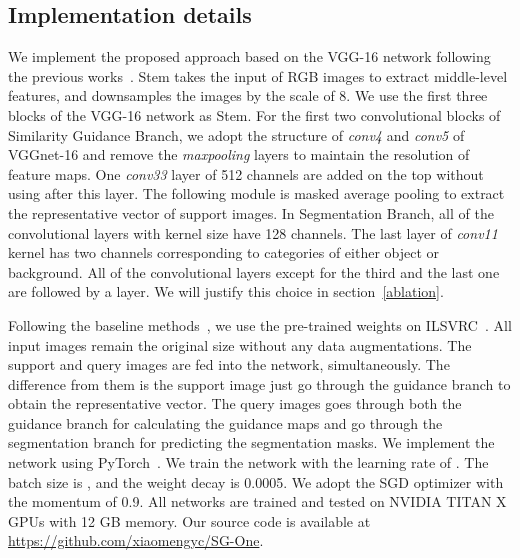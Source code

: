 \documentclass[journal]{IEEEtran}
\begin{document}
\subsection{Implementation details}
We implement the proposed approach based on the VGG-16 network following the previous works~\cite{shaban2017one,rakelly2018conditional}.
Stem takes the input of RGB images to extract middle-level features, and downsamples the images by the scale of 8.
We use the first three blocks of the VGG-16 network as Stem.
For the first two convolutional blocks of Similarity Guidance Branch, we adopt the structure of \textit{conv4} and \textit{conv5} of VGGnet-16 and remove the \textit{maxpooling} layers to maintain the resolution of feature maps.
One \textit{conv33} layer of 512 channels are added on the top without using  after this layer. 
The following module is masked average pooling to extract the representative vector of support images.
In Segmentation Branch, all of the convolutional layers with  kernel size have 128 channels.
The last layer of \textit{conv11} kernel has two channels corresponding to categories of either object or background. 
All of the convolutional layers except for the third and the last one are followed by a  layer.
We will justify this choice in section~\ref{ablation}.

Following the baseline methods~\cite{shaban2017one,rakelly2018conditional}, we use the pre-trained weights on ILSVRC~\cite{ILSVRC15}. 
All input images remain the original size without any data augmentations. 
The support and query images are fed into the network, simultaneously.
The difference from them is the support image just go through the guidance branch to obtain the representative vector.
The query images goes through both the guidance branch for calculating the guidance maps and go through the segmentation branch for predicting the segmentation masks.
We implement the network using PyTorch~\cite{pytorch}.
We train the network with the learning rate of .
The batch size is , and the weight decay is 0.0005.
We adopt the SGD optimizer with the momentum of 0.9.
All networks are trained and tested on NVIDIA TITAN X GPUs with 12 GB memory.
Our source code is available at \url{https://github.com/xiaomengyc/SG-One}.
\end{document}
